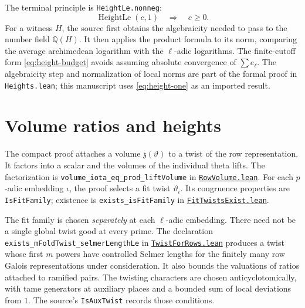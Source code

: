 \documentclass[11pt,oneside,openany]{amsbook}
\theoremstyle{remark}
\numberwithin{equation}{section}
\newcommand{\Q}{\mathbb Q}
\newcommand{\ghroot}{https://github.com/lsernau/grh-lean/blob/}
\newcommand{\ghrev}{72fead102f663d5c7a407964a13dc0cf9d977207}
\newcommand{\leanfile}[2]{%
  \href{\ghroot\ghrev/grh-compact/src/#1}{\nolinkurl{#2}}}
\begin{document}
The terminal principle is \texttt{HeightLe.nonneg}:
\begin{equation}
\label{eq:height-one}
\operatorname{HeightLe}(c,1)\quad\Longrightarrow\quad c\ge0.
\end{equation}
For a witness $H$, the source first obtains the
algebraicity needed to pass to the number field $\Q(H)$.
It then applies the product formula to its norm, comparing
the average archimedean logarithm with the $\ell$-adic
logarithms. The finite-cutoff form
\eqref{eq:height-budget} avoids assuming absolute
convergence of $\sum e_\ell$. The algebraicity step and
normalization of local norms are part of the formal proof
in \texttt{Heights.lean}; this manuscript uses
\eqref{eq:height-one} as an imported result.

\section{Volume ratios and heights}
The compact proof attaches a volume $\mathfrak z(\vartheta)$
to a twist of the row representation. It factors into a scalar
and the volumes of the individual theta lifts. The factorization
is \texttt{volume\_iota\_eq\_prod\_liftVolume} in
\leanfile{New/Rows/RowVolume.lean}{RowVolume.lean}.
For each $p$-adic embedding $\iota$, the proof selects a fit
twist $\vartheta_\iota$. Its congruence properties are
\texttt{IsFitFamily}; existence is
\texttt{exists\_isFitFamily} in
\leanfile{New/Selmer/FitTwistsExist.lean}{FitTwistsExist.lean}.

The fit family is chosen \emph{separately} at each
$\ell$-adic embedding. There need not be a single global
twist good at every prime. The declaration
\texttt{exists\_mFoldTwist\_selmerLengthLe} in
\leanfile{New/Selmer/TwistForRows.lean}%
{TwistForRows.lean} produces a twist whose first $m$
powers have controlled Selmer lengths for the finitely
many row Galois representations under consideration.
It also bounds the valuations of ratios attached to
ramified pairs. The twisting characters are chosen
anticyclotomically, with tame generators at auxiliary
places and a bounded sum of local deviations from $1$.
The source's \texttt{IsAuxTwist} records those conditions.
\end{document}
